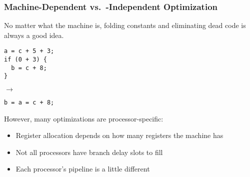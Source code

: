 \documentclass{plt}
\begin{document}
\begin{frame}[fragile=singleslide]
  \frametitle{Machine-Dependent vs.\ -Independent Optimization}

No matter what the machine is, folding constants and eliminating dead
code is always a good idea.

\begin{minipage}{0.35\textwidth}
\begin{verbatim}
a = c + 5 + 3;
if (0 + 3) {
  b = c + 8;
}
\end{verbatim}
\end{minipage}
$\rightarrow$\hspace{1pc}
\begin{minipage}{0.35\textwidth}
\begin{verbatim}
b = a = c + 8;
\end{verbatim}
\end{minipage}

However, many optimizations are processor-specific:

\begin{itemize}
\item Register allocation depends on how many registers the machine has

\item Not all processors have branch delay slots to fill

\item Each processor's pipeline is a little different
\end{itemize}

\end{frame}
\end{document}
